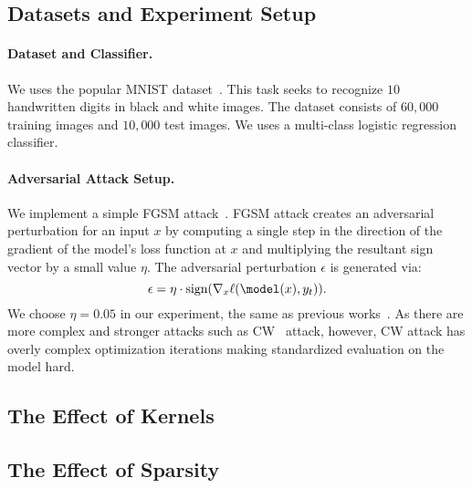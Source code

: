 \documentclass{article}
\begin{document}
\subsection{Datasets and Experiment Setup}
  
\paragraph{Dataset and Classifier. } We uses the popular MNIST dataset~\cite{lecun1995mnist}. This task seeks to recognize $10$ handwritten digits in black and white images. The dataset consists of $60,000$ training images and $10,000$ test images. We uses a multi-class logistic regression classifier. 

\paragraph{Adversarial Attack Setup. } We implement a simple FGSM attack~\cite{goodfellow2014explaining}. FGSM attack 
creates an adversarial perturbation for an input $x$ by computing a single step in the direction of the gradient of the model's loss function at $x$ and multiplying the resultant sign vector by a small value $\eta$. The adversarial perturbation $\epsilon$ is generated via:
\[
\epsilon = \eta \cdot \text{sign}(\nabla_x \ell(\model(x), y_t)).
\]
We choose $\eta = 0.05$ in our experiment, the same as previous works~\cite{shan2020gotta,xu2017feature}. As there are more complex and stronger attacks such as CW~\cite{cwattack} attack, however, CW attack has overly complex optimization iterations making standardized evaluation on the model hard. 


\subsection{The Effect of Kernels}

\subsection{The Effect of Sparsity}
\end{document}
